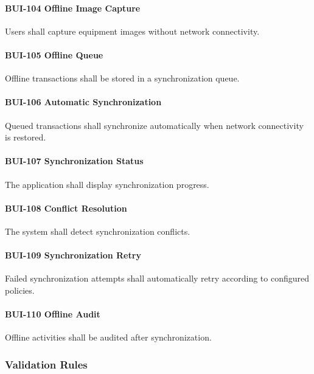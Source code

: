 \paragraph{BUI-104 Offline Image Capture}

Users shall capture equipment images without network connectivity.

\paragraph{BUI-105 Offline Queue}

Offline transactions shall be stored in a synchronization queue.

\paragraph{BUI-106 Automatic Synchronization}

Queued transactions shall synchronize automatically when network
connectivity is restored.

\paragraph{BUI-107 Synchronization Status}

The application shall display synchronization progress.

\paragraph{BUI-108 Conflict Resolution}

The system shall detect synchronization conflicts.

\paragraph{BUI-109 Synchronization Retry}

Failed synchronization attempts shall automatically retry according to
configured policies.

\paragraph{BUI-110 Offline Audit}

Offline activities shall be audited after synchronization.


\subsubsection*{Validation Rules}

